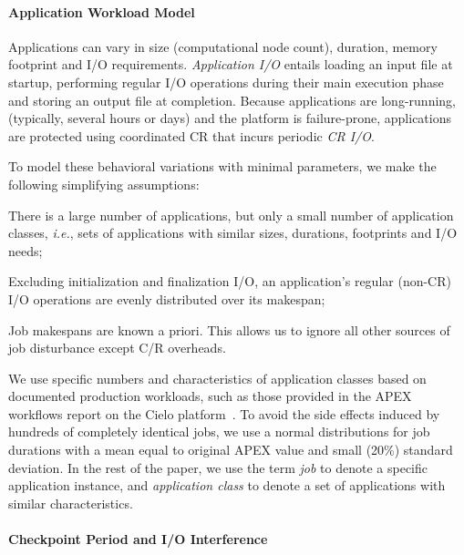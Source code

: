 \documentclass[two]{article}
\newcommand{\ie}[0]{\emph{i.e.}\xspace}
\begin{document}
\paragraph*{Application Workload Model}

Applications can vary in size (computational node count), duration, memory
footprint and I/O requirements.  \emph{Application I/O} entails loading an input file
at startup, performing regular I/O operations during their main execution phase and
storing an output file at completion. Because applications are long-running,
(typically, several hours or days) and the platform is failure-prone, applications
are protected using coordinated CR that incurs periodic \emph{CR I/O}.

To model these behavioral variations with minimal parameters, we make the following
simplifying assumptions:
\begin{compactitem}
\item There is a large number of applications, but only a small number of application
  classes, \ie, sets of applications with similar sizes, durations, footprints and
  I/O needs;
\item Excluding initialization and finalization I/O, an application's regular
  (non-CR) I/O operations are evenly distributed over its makespan;
\item Job makespans are known a priori. This allows us to ignore all other
  sources of job disturbance except C/R overheads.
\end{compactitem}

We use specific numbers and characteristics of application classes based on
documented production workloads, such as those provided in the APEX workflows report
on the Cielo platform~\cite{apex2016}.  To avoid the side effects induced by
hundreds of completely identical jobs, we use a normal distributions for job
durations with a mean equal to original APEX value and small (20\%) standard
deviation.  In the rest of the paper, we use the term \emph{job} to denote
a specific application instance, and \emph{application class} to denote a set
of applications with similar characteristics.

\paragraph*{Checkpoint Period and I/O Interference}
\end{document}
